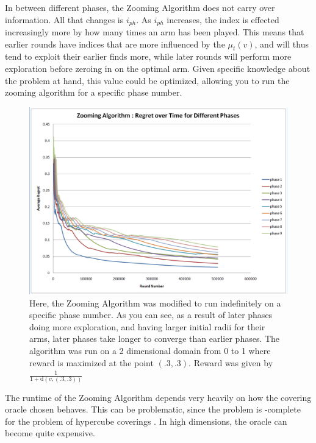 In between different phases, the Zooming Algorithm does not carry over
information. All that changes is $i_{ph}$. As $i_{ph}$ increases, the
index is effected increasingly more by how many times an arm has been
played. This means that earlier rounds have indices that are more
influenced by the $\mu_t(v)$, and will thus tend to exploit their
earlier finds more, while later rounds will perform more exploration
before zeroing in on the optimal arm. Given specific knowledge about
the problem at hand, this value could be optimized, allowing you to
run the zooming algorithm for a specific phase number.

\begin{figure}[!ht]
  \begin{center}
    \includegraphics[width=5 in]{figures/Phase_Comparison.png}
     \caption{Here, the Zooming Algorithm was modified to run
       indefinitely on a specific phase number. As you can see, as a
       result of later phases doing more exploration, and having
       larger initial radii for their arms, later phases take longer
       to converge than earlier phases. The algorithm was run on a 2
       dimensional domain from 0 to 1 where reward is maximized at the
       point $(.3,.3)$. Reward was given by
       $\frac{1}{1+\mathrm{d}(v,(.3,.3))}$}
     \label{fig:zoomphase}
  \end{center}
\end{figure}



The runtime of the Zooming Algorithm depends very heavily on how the
covering oracle chosen behaves. This can be problematic, since the
problem is \NP-complete for the problem of hypercube coverings
\cite{Hoffmann05acovering} . In high dimensions, the oracle can become
quite expensive.


